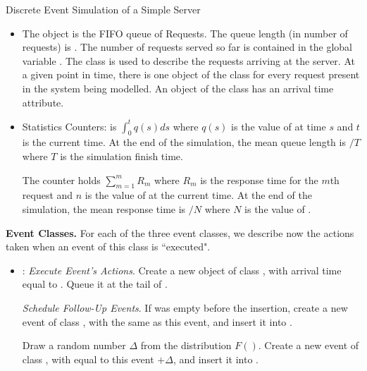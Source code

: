 \begin{ex}{Discrete Event Simulation of a Simple Server}
\begin{itemize}
There are three  subclasses: an event of the class
 represents the actions that occur when a request
arrives;  is when a request enters service;
 is when a request leaves the system. The event
classes are described in detail later.

\item  The object  is the FIFO queue of
  Requests. The queue length (in number of
  requests) is .
  The number of requests served so far is contained in the global variable .
  The class  is used to describe the requests arriving at the server. At a given point in time,
  there is one
  object of the class  for every request present in the system being modelled. An object of the class
   has an arrival time attribute.

\item Statistics Counters:  is $\int_0^t
q(s)ds$ where $q(s)$ is the value of  at time
 $s$ and $t$ is the current time. At the end of the simulation, the
mean queue length is $/T$ where $T$ is the
simulation finish time.

The counter  holds $\sum_{m=1}^m R_m$ where
$R_m$ is the response time for the $m$th request and $n$ is the
value of  at the current time. At the end of the
simulation, the mean response time is $/N$
where $N$ is the value of .
\end{itemize}

\textbf{Event Classes. }For each of the three event classes, we
describe now the actions taken when an event of this class is
``executed".
\begin{itemize}
    \item {}: \emph{Execute Event's Actions}. Create a
    new
    object of class , with
    arrival time equal to . Queue it at the
    tail of .

    \emph{Schedule Follow-Up Events}. If  was empty before the insertion,
    create a new event of class ,
    with the same  as this event, and insert it
    into .

    Draw a random number $\Delta$ from the distribution $F()$.
    Create a new event of class ,
    with  equal to this event  $+\Delta$,
    and insert it into .


\end{itemize}
\end{ex}

